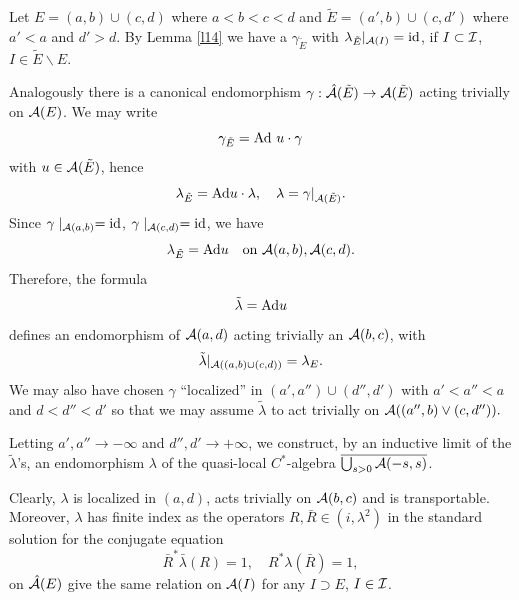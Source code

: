 \documentclass[12pt]{article}
\def\proof{\trivlist \item[\hskip \labelsep{\bf Proof\ }]}
\def\Ad{{\hbox{\rm Ad}}}
\def\setminus{\smallsetminus}
\def\A{{\cal A}}
\def\I{{\cal I}}
\begin{document}
\proof
Let $E=(a,b)\cup(c,d)$ where $a<b<c<d$ and $\tilde E=(a',b)\cup(c,d')$
where $a'<a$ and $d'>d$. By Lemma \ref{l14} we have a $\gamma_{\tilde
E}$ with
$\lambda_{\tilde E}\vert_{\A(I)}=\hbox{\rm id}$, if $I\subset \I$,
$I\in\tilde E\setminus E$.

Analogously there is a canonical endomorphism
$\gamma:\hat \A(\tilde E)\to \A(\tilde E)$ acting trivially
on $\A(E)$. We may write
$$\gamma_{\tilde E}=\Ad\ u\cdot\gamma
$$
with $u\in \A(\tilde E)$, hence
$$
\lambda_{\tilde E}=\Ad u\cdot \lambda,\quad
\lambda=\gamma\vert_{\A(\tilde E)}.
$$
Since $\gamma\mid_{\A(a,b)}=\hbox{\rm id}$, $\gamma\mid_
{\A(c,d)}=\hbox{\rm id}$, we have
$$
\lambda_{\tilde E}=\Ad u\quad \hbox{\rm on\ }
\A(a,b), \A(c,d).
$$
Therefore, the formula
$$\tilde\lambda=\Ad u $$
defines an endomorphism of $\A(a,d)$ acting  trivially
an $\A(b,c)$, with
$$\tilde \lambda\vert_{\A((a,b)\cup (c,d))}=\lambda_E.
$$
We may also have chosen $\gamma$ ``localized''  in $(a',a'')\cup
(d'',d')$
with $a'<a''<a$ and $d<d''<d'$
so that we may assume $\tilde\lambda$ to act trivially on
$\A((a'',b)\vee (c,d'')).$

Letting $a',a''\to -\infty$ and $d'',d'\to +\infty$,
we construct, by an inductive limit of the
$\tilde \lambda$'s, an endomorphism $\lambda$ of
the quasi-local $C^*$-algebra $\overline{\bigcup_{s>0} \A(-s,s)}$.

Clearly, $\lambda$ is localized in $(a,d)$,
acts trivially on $\A(b,c)$ and is transportable. Moreover, $\lambda$
has finite index as the operators $R,\bar R\in(i,\lambda^2)$
in the standard solution for the conjugate equation
\cite{L2,LRo}
$$
\bar R^*\bar\lambda (R)=1,\quad R^*\lambda (\bar R)=1,
$$
on $\hat \A(E)$ give the same relation on $\A(I)$ for any $
I\supset E$, $I\in\I$.
\end{document}
